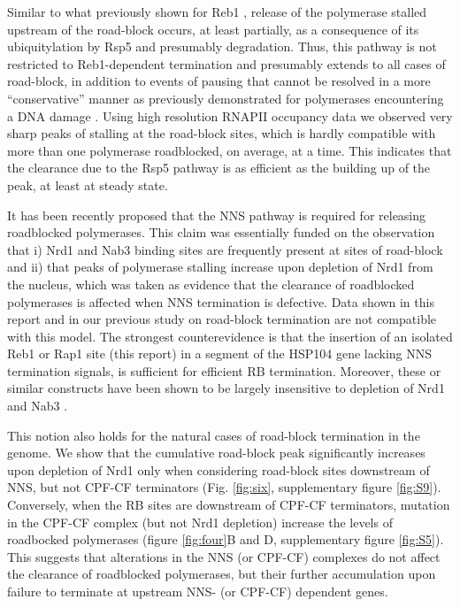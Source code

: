 Similar to what previously shown for Reb1 \cite{colin:2014:roadblock}, release of the polymerase stalled upstream of the road-block occurs, at least partially, as a consequence of its ubiquitylation by Rsp5 and presumably degradation. Thus, this pathway is not restricted to Reb1-dependent termination and presumably extends to all cases of road-block, in addition to events of pausing that cannot be resolved in a more “conservative” manner as previously demonstrated for polymerases encountering a DNA damage \cite{wilson:2013:ubiquitylation}. Using high resolution RNAPII occupancy data we observed very sharp peaks of stalling at the road-block sites, which is hardly compatible with more than one polymerase roadblocked, on average, at a time. This indicates that the clearance due to the Rsp5 pathway is as efficient as the building up of the peak, at least at steady state.

It has been recently proposed that the NNS pathway is required for releasing roadblocked polymerases. This claim was essentially funded on the observation that i) Nrd1 and Nab3 binding sites are frequently present at sites of road-block and ii) that peaks of polymerase stalling increase upon depletion of Nrd1 from the nucleus, which was taken as evidence that the clearance of roadblocked polymerases is affected when NNS termination is defective. Data shown in this report and in our previous study on road-block termination are not compatible with this model. The strongest counterevidence is that the insertion of an isolated Reb1 \cite{colin:2014:roadblock} or Rap1 site (this report) in a segment of the HSP104 gene lacking NNS termination signals, is sufficient for efficient RB termination. Moreover, these or similar constructs have been shown to be largely insensitive to depletion of Nrd1 and Nab3 \cite[data not shown]{colin:2014:roadblock}. 

This notion also holds for the natural cases of road-block termination in the \cer{} genome. We show that the cumulative road-block peak significantly increases upon depletion of Nrd1 only when considering road-block sites downstream of NNS, but not CPF-CF terminators (Fig. \ref{fig:six}, supplementary figure \ref{fig:S9}). Conversely, when the RB sites are downstream of CPF-CF terminators, mutation in the CPF-CF complex (but not Nrd1 depletion) increase the levels of roadbocked polymerases (figure \ref{fig:four}B and D, supplementary figure \ref{fig:S5}).  This suggests that alterations in the NNS (or CPF-CF) complexes do not affect the clearance of roadblocked polymerases, but their further accumulation upon failure to terminate at upstream NNS- (or CPF-CF) dependent genes. 

